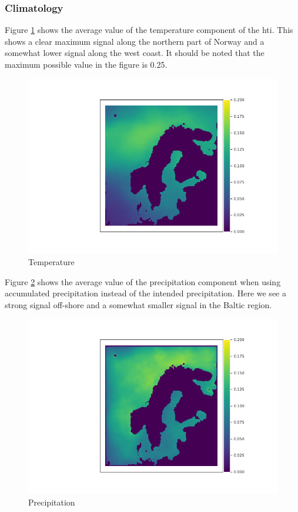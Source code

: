 \subsubsection{Climatology}
Figure \ref{fig:temperaturemeps} shows the average value of the temperature component of the \acrshort{hti}. This shows a clear maximum signal along the northern part of Norway and a somewhat lower signal along the west coast. It should be noted that the maximum possible value in the figure is 0.25. 

\begin{figure}
    \centering
    \includegraphics[width = \textwidth]{Figures/T.png}
    \caption{Temperature}
    \label{fig:temperaturemeps}
\end{figure}

Figure \ref{fig:precipitationmeps} shows the average value of the precipitation component when using accumulated precipitation instead of the intended precipitation. Here we see a strong signal off-shore and a somewhat smaller signal in the Baltic region. 

\begin{figure}
    \centering
    \includegraphics[width = \textwidth]{Figures/P.png}
    \caption{Precipitation}
    \label{fig:precipitationmeps}
\end{figure}

